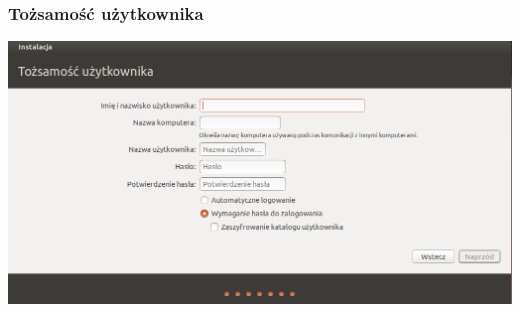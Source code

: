 \subsubsection{Tożsamość użytkownika}
\begin{center}
        \includegraphics[width=\linewidth]{images/instalator_dane.png}
\end{center}

